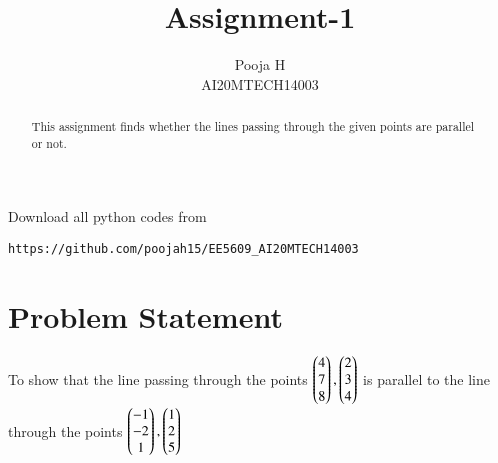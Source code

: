 \documentclass[journal,12pt,twocolumn]{IEEEtran}
\begin{document}
\let\vec\mathbf
\renewcommand{\thefigure}{\theproblem}
\def\putbox#1#2#3{\makebox[0in][l]{\makebox[#1][l]{}\raisebox{\baselineskip}[0in][0in]{\raisebox{#2}[0in][0in]{#3}}}}
     \def\rightbox#1{\makebox[0in][r]{#1}}
     \def\centbox#1{\makebox[0in]{#1}}
     \def\topbox#1{\raisebox{-\baselineskip}[0in][0in]{#1}}
     \def\midbox#1{\raisebox{-0.5\baselineskip}[0in][0in]{#1}}
\vspace{3cm}
\title{Assignment-1}
\author{Pooja H \\ AI20MTECH14003}
\maketitle
\newpage
\bigskip
\renewcommand{\thefigure}{\theenumi}
\renewcommand{\thetable}{\theenumi}
\begin{abstract}
This assignment finds whether the lines passing through the given points are parallel or not.
\end{abstract}
Download all python codes from 
\begin{lstlisting}
https://github.com/poojah15/EE5609_AI20MTECH14003
\end{lstlisting}


\section{Problem Statement}
To show that the line passing through the points $\begin{pmatrix}4\\7\\8\end{pmatrix}, \begin{pmatrix}2\\3\\4\end{pmatrix}$ is parallel to the line through the points $\begin{pmatrix}-1\\-2\\1\end{pmatrix}, \begin{pmatrix}1\\2\\5\end{pmatrix}$
\end{document}
